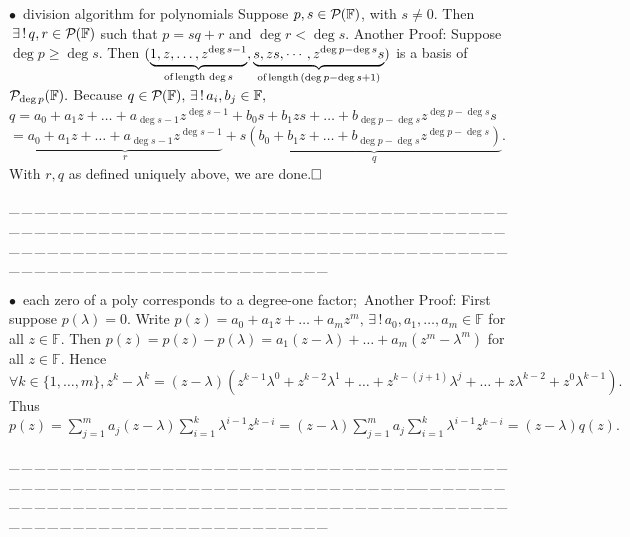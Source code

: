 \documentclass[a4paper, 11pt, UTF8]{article}
\def\Fbb{{\mathbb{F}}}
\def\BulletPoint{{\small$\bullet$}}
\def\ProblemEnding{{\tiny \_\,\_\,\_\,\_\,\_\,\_\,\_\,\_\,\_\,\_\,\_\,\_\,\_\,\_\,\_\,\_\,\_\,\_\,\_\,\_\,\_\,\_\,\_\,\_\,\_\,\_\,\_\,\_\,\_\,\_\,\_\,\_\,\_\,\_\,\_\,\_\,\_\,\_\,\_\,\_\,\_\,\_\,\_\,\_\,\_\,\_\,\_\,\_\,\_\,\_\,\_\,\_\,\_\,\_\,\_\,\_\,\_\,\_\,\_\,\_\,\_\,\_\,\_\,\_\,\_\,\_\,\_\,\_\,\_\,\_\,\_\_\,\_\,\_\,\_\,\_\,\_\,\_\,\_\,\_\,\_\,\_\,\_\,\_\,\_\,\_\,\_\,\_\,\_\,\_\,\_\,\_\,\_\,\_\,\_\,\_\,\_\,\_\,\_\,\_\,\_\,\_\,\_\,\_\,\_\,\_\,\_\,\_\,\_\,\_\,\_\,\_\,\_\,\_\,\_\,\_\,\_\,\_\,\_\,\_\,\_\,\_\,\_\,\_\,\_\,\_\,\_\,\_\,\_\,\_\,\_\,\_\,\_\,\_\,\_\,\_\,\_\,\_\,\_\,\_\,\_\,\_}}
\begin{document}
\begin{large}
\BulletPoint \,\hspace{1pt}\NoteFor{[4.8]} {\timessl division algorithm for polynomials}\TextB{}
{\timessl\normalsize Suppose $p, s\in\PoF{}$, with $s\neq 0$. Then $\,\exists\,!\,q, r\in\PoF{}$ such that $p = sq + r$ and $\deg r < \deg s$.} {\timessl\Large Another Proof:}\TextB{}
Suppose $\deg p\geq \deg s$. Then $(\underbrace{1, z,\dots, z^{\deg s-1}}_{\textup{of\,length}\,\deg s},\underbrace{s,zs,\cdots,z^{\deg p-\deg s}s}_{\textup{of\,length}\,(\deg p-\deg s+1)})$ is a basis of $\PoF{\deg p}.$\TextB{}
Because $q\in\PoF{},\,\exists\,!\,a_i,b_j\in\Fbb,$\TextB{}
$q=a_0+a_1 z+\dots+a_{\deg s-1}z^{\deg s-1}+ b_0 s+b_1 zs +\dots+ b_{\deg p-\deg s}z^{\deg p-\deg s}s$\TextB{}
$=\underbrace{a_0+a_1 z+\dots+a_{\deg s-1}z^{\deg s-1}}_{r}+s\underbrace{(b_0+b_1 z +\dots+ b_{\deg p-\deg s}z^{\deg p-\deg s})}_{q}.$\TextB{}
With $r,q$ as defined uniquely above, we are done.$\hfill\square$\par
\ProblemEnding\par

\BulletPoint \,\hspace{1pt}\NoteFor{[4.11]} {\timessl each zero of a poly corresponds to a degree-one factor;}\,\,\,{\timessl\Large Another Proof:}\TextB{}
First suppose $p(\lambda)=0.$ Write $p(z)=a_0+a_1 z+\dots+a_m z^m,\,\exists\,!\,a_0,a_1,\dots,a_m\in\Fbb$ for all $z\in\Fbb.$\TextB{}
Then $p(z)=p(z)-p(\lambda)=a_1(z-\lambda)+\dots+a_m(z^m-\lambda^m)$ for all $z\in\Fbb.$\TextB{}
Hence $\forall k\in\{1,\dots,m\},z^k-\lambda^k=(z-\lambda)( z^{k-1}\lambda^0+ z^{k-2}\lambda^1+\dots+z^{k-(j+1)}\lambda^j+\dots+z\lambda^{k-2}+z^0\lambda^{k-1}).$\TextB{}
Thus $p(z)=\sum\limits_{j=1}^m a_j (z-\lambda)\sum\limits_{i=1}^k \lambda^{i-1}z^{k-i}=(z-\lambda)\sum\limits_{j=1}^m a_j\sum\limits_{i=1}^k \lambda^{i-1}z^{k-i}=(z-\lambda)q(z).$
\par
\ProblemEnding\par


\end{large}
\end{document}
